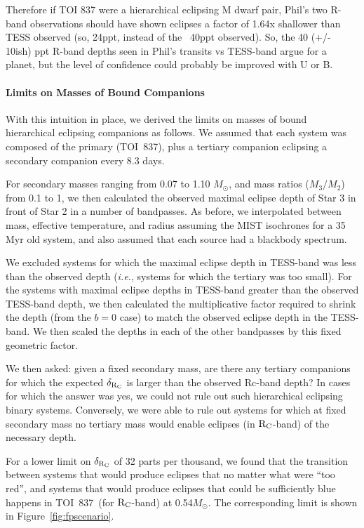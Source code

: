 \documentclass[12pt,twocolumn,tighten]{aastex62}
\newcommand{\tn}{TOI~837} %
\begin{document}
Therefore if TOI 837 were a hierarchical eclipsing M dwarf pair,
Phil's two R-band observations should have shown eclipses a factor of
1.64x shallower than TESS observed (so, 24ppt, instead of the ~40ppt
observed). So, the 40 (+/- 10ish) ppt R-band depths seen in Phil's
transits vs TESS-band argue for a planet, but the level of confidence
could probably be improved with U or B.

\paragraph{Limits on Masses of Bound Companions}

With this intuition in place, we derived the limits on masses of bound
hierarchical eclipsing companions as follows.  We assumed that each
system was composed of the primary (\tn), plus a tertiary companion
eclipsing a secondary companion every 8.3 days.

For secondary masses ranging from 0.07 to 1.10 $M_\odot$, and
mass ratios ($M_3/M_2$) from 0.1 to 1, we then 
calculated the observed maximal eclipse depth of Star 3 in front of
Star 2 in a number of bandpasses.
As before, we interpolated between mass, effective temperature, and radius
assuming the MIST isochrones for a 35$\,$Myr old system,
and also assumed that each source had a blackbody spectrum.

We excluded systems for which the maximal eclipse depth in TESS-band
was less than the observed depth ({\it i.e.}, systems for which the tertiary
was too small).
For the systems with maximal eclipse depths in TESS-band greater than
the observed TESS-band depth, we then calculated the multiplicative
factor required to shrink the depth (from the $b=0$ case) to match the
observed eclipse depth in the TESS-band.
We then scaled the depths in each of the other bandpasses by this
fixed geometric factor.

We then asked: given a fixed secondary mass, are there any tertiary
companions for which the expected $\delta_{\rm R_C}$ is larger than
the observed Rc-band depth?
In cases for which the answer was yes, we could not rule out such
hierarchical eclipsing binary systems.
Conversely, we were able to rule out systems
for which at fixed secondary mass no tertiary mass would
enable eclipses (in ${\rm R_C}$-band) of the necessary depth.

For a lower limit on $\delta_{\rm R_C}$ of 32 parts per thousand,
we found that the transition between systems that would produce
eclipses that no matter what were ``too red'', and systems that would
produce eclipses that could be sufficiently blue happens in \tn\ (for
${\rm R_C}$-band) at 0.54$M_\odot$.
The corresponding limit is shown in Figure~\ref{fig:fpscenario}.
\end{document}

